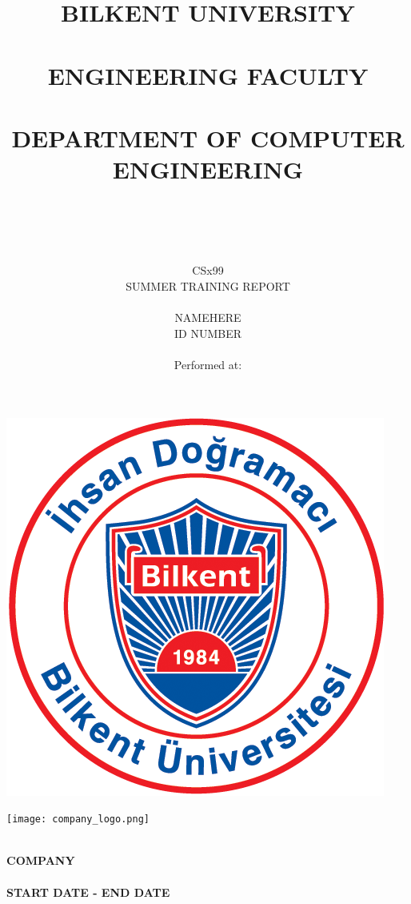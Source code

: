 \documentclass[10pt]{article}
\title{BILKENT UNIVERSITY \\ ~\\ ENGINEERING FACULTY \\ ~\\
DEPARTMENT OF COMPUTER ENGINEERING \\ ~\\ ~\\}
\author{CSx99 \\ SUMMER TRAINING REPORT \\ ~\\ NAMEHERE \\ ID NUMBER \\ ~\\ Performed at:}
\begin{document}
\begin{titlingpage} %
    \begin{center}
        \begin{large}
            \textbf{\thetitle} %
        \end{large}

        \includegraphics[scale=1.3]{bilkent_logo.png}\\ %

        \begin{LARGE}
            \textbf{\theauthor} %
        \end{LARGE}

        \texttt{[image: company\_logo.png]} %

        \begin{Large}
            \textbf{\\ COMPANY ~\\}
            \textbf{\\ START DATE - END DATE}
        \end{Large}
    \end{center}
\end{titlingpage}

\tableofcontents

\newpage
\end{document}
